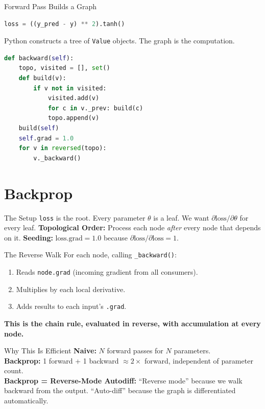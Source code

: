 \documentclass[10pt]{beamer}
\begin{document}
\begin{frame}{Forward Pass Builds a Graph}
    \begin{lstlisting}[language=Python, caption={Writing expressions builds a Value DAG}]
loss = ((y_pred - y) ** 2).tanh()
    \end{lstlisting}
    Python constructs a tree of \texttt{Value} objects. The graph is the computation.
    \vspace{0.5cm}
    \begin{lstlisting}[language=Python, caption={The backward algorithm}]
def backward(self):
    topo, visited = [], set()
    def build(v):
        if v not in visited:
            visited.add(v)
            for c in v._prev: build(c)
            topo.append(v)
    build(self)
    self.grad = 1.0
    for v in reversed(topo):
        v._backward()
    \end{lstlisting}
\end{frame}

\section{Backprop}

\begin{frame}{The Setup}
    \texttt{loss} is the root. Every parameter $\theta$ is a leaf. We want $\partial\text{loss}/\partial\theta$ for every leaf.
    \vspace{0.5cm}
    \textbf{Topological Order:} Process each node \emph{after} every node that depends on it.
    \vspace{0.5cm}
    \textbf{Seeding:} $\text{loss.grad} = 1.0$ because $\partial\text{loss}/\partial\text{loss} = 1$.
\end{frame}

\begin{frame}{The Reverse Walk}
    For each node, calling \texttt{\_backward()}:
    \begin{enumerate}
        \item Reads \texttt{node.grad} (incoming gradient from all consumers).
        \item Multiplies by each local derivative.
        \item Adds results to each input's \texttt{.grad}.
    \end{enumerate}
    \textbf{This is the chain rule, evaluated in reverse, with accumulation at every node.}
\end{frame}

\begin{frame}{Why This Is Efficient}
    \textbf{Naive:} $N$ forward passes for $N$ parameters.\\
    \textbf{Backprop:} 1 forward + 1 backward $\approx 2\times$ forward, independent of parameter count.\\[4pt]
    \textbf{Backprop = Reverse-Mode Autodiff:} ``Reverse mode'' because we walk backward from the output. ``Auto-diff'' because the graph is differentiated automatically.
\end{frame}
\end{document}
